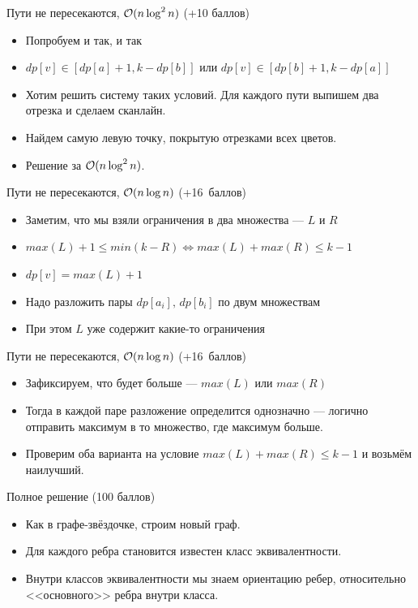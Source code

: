 \begin{frame}{Пути не пересекаются, $\mathcal{O}(n \log^2 n)$ (+10 баллов)}
  \begin{itemize}
    \item Попробуем и так, и так
    \item $dp[v] \in [dp[a] + 1, k - dp[b]]$ или $dp[v] \in [dp[b] + 1, k - dp[a]]$
    \item Хотим решить систему таких условий. Для каждого пути выпишем два отрезка и сделаем сканлайн.
    \item Найдем самую левую точку, покрытую отрезками всех цветов.
    \item Решение за $\mathcal{O}(n \log^2 n)$.
  \end{itemize}
\end{frame}

\begin{frame}{Пути не пересекаются, $\mathcal{O}(n \log n)$ (+16~баллов)}
  \begin{itemize}
    \item Заметим, что мы взяли ограничения в два множества --- $L$ и $R$
    \item $max(L) + 1 \le min(k - R) \iff max(L) + max(R) \le k - 1$
    \item $dp[v] = max(L) + 1$
    \item Надо разложить пары $dp[a_i],\,dp[b_i]$ по двум множествам
    \item При этом $L$ уже содержит какие-то ограничения
  \end{itemize}
\end{frame}

\begin{frame}{Пути не пересекаются, $\mathcal{O}(n \log n)$ (+16~баллов)}
  \begin{itemize}
    \item Зафиксируем, что будет больше --- $max(L)$ или $max(R)$
    \item Тогда в каждой паре разложение определится однозначно --- логично отправить максимум в то множество, где максимум больше.
    \item Проверим оба варианта на условие $max(L) + max(R) \le k - 1$ и возьмём наилучший.
  \end{itemize}
\end{frame}

\begin{frame}{Полное решение (100 баллов)}
  \begin{itemize}
    \item Как в графе-звёздочке, строим новый граф.
    \item Для каждого ребра становится известен класс эквивалентности.
    \item Внутри классов эквивалентности мы знаем ориентацию ребер, относительно <<основного>> ребра внутри класса.
  \end{itemize}
\end{frame}

